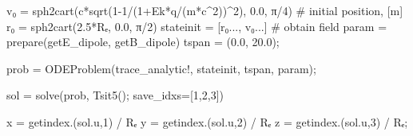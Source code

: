 \documentclass[
  a4paper,
  DIV=11]{scrreprt}
\newenvironment{Shaded}{\begin{snugshade}}{\end{snugshade}}
\newcommand{\CommentTok}[1]{\textcolor[rgb]{0.37,0.37,0.37}{#1}}
\newcommand{\ConstantTok}[1]{\textcolor[rgb]{0.56,0.35,0.01}{#1}}
\newcommand{\FloatTok}[1]{\textcolor[rgb]{0.68,0.00,0.00}{#1}}
\newcommand{\FunctionTok}[1]{\textcolor[rgb]{0.28,0.35,0.67}{#1}}
\newcommand{\NormalTok}[1]{\textcolor[rgb]{0.00,0.23,0.31}{#1}}
\newcommand{\OperatorTok}[1]{\textcolor[rgb]{0.37,0.37,0.37}{#1}}
\begin{document}
\begin{Shaded}
\begin{Highlighting}[]
\NormalTok{v₀ }\OperatorTok{=} \FunctionTok{sph2cart}\NormalTok{(}\FunctionTok{c*sqrt}\NormalTok{(}\FloatTok{1}\OperatorTok{{-}}\FloatTok{1}\OperatorTok{/}\NormalTok{(}\FloatTok{1}\OperatorTok{+}\NormalTok{Ek}\OperatorTok{*}\NormalTok{q}\OperatorTok{/}\NormalTok{(m}\OperatorTok{*}\NormalTok{c}\OperatorTok{\^{}}\FloatTok{2}\NormalTok{))}\OperatorTok{\^{}}\FloatTok{2}\NormalTok{), }\FloatTok{0.0}\NormalTok{, }\ConstantTok{π}\OperatorTok{/}\FloatTok{4}\NormalTok{)}
\CommentTok{\# initial position, [m]}
\NormalTok{r₀ }\OperatorTok{=} \FunctionTok{sph2cart}\NormalTok{(}\FloatTok{2.5}\OperatorTok{*}\NormalTok{Rₑ, }\FloatTok{0.0}\NormalTok{, }\ConstantTok{π}\OperatorTok{/}\FloatTok{2}\NormalTok{)}
\NormalTok{stateinit }\OperatorTok{=}\NormalTok{ [r₀}\OperatorTok{...}\NormalTok{, v₀}\OperatorTok{...}\NormalTok{]}
\CommentTok{\# obtain field}
\NormalTok{param }\OperatorTok{=} \FunctionTok{prepare}\NormalTok{(getE\_dipole, getB\_dipole)}
\NormalTok{tspan }\OperatorTok{=}\NormalTok{ (}\FloatTok{0.0}\NormalTok{, }\FloatTok{20.0}\NormalTok{);}
\end{Highlighting}
\end{Shaded}

\begin{Shaded}
\begin{Highlighting}[]
\NormalTok{prob }\OperatorTok{=} \FunctionTok{ODEProblem}\NormalTok{(trace\_analytic!, stateinit, tspan, param);}
\end{Highlighting}
\end{Shaded}

\begin{Shaded}
\begin{Highlighting}[]
\NormalTok{sol }\OperatorTok{=} \FunctionTok{solve}\NormalTok{(prob, }\FunctionTok{Tsit5}\NormalTok{(); save\_idxs}\OperatorTok{=}\NormalTok{[}\FloatTok{1}\NormalTok{,}\FloatTok{2}\NormalTok{,}\FloatTok{3}\NormalTok{])}

\NormalTok{x }\OperatorTok{=} \FunctionTok{getindex}\NormalTok{.(sol.u,}\FloatTok{1}\NormalTok{) }\OperatorTok{/}\NormalTok{ Rₑ}
\NormalTok{y }\OperatorTok{=} \FunctionTok{getindex}\NormalTok{.(sol.u,}\FloatTok{2}\NormalTok{) }\OperatorTok{/}\NormalTok{ Rₑ}
\NormalTok{z }\OperatorTok{=} \FunctionTok{getindex}\NormalTok{.(sol.u,}\FloatTok{3}\NormalTok{) }\OperatorTok{/}\NormalTok{ Rₑ;}
\end{Highlighting}
\end{Shaded}
\end{document}
